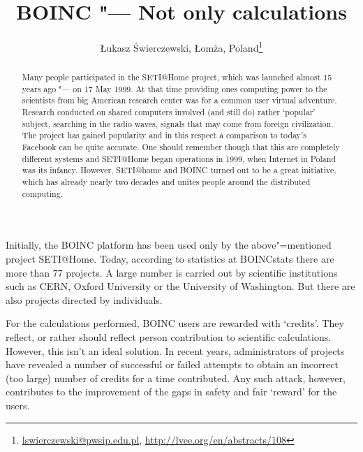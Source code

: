 \documentclass[10pt, a5paper]{article}
\begin{document}
\title{BOINC "--- Not only calculations}
\author{\L{}ukasz \'S{}wierczewski, \L{}om\.z{}a, Poland\footnote{\url{lswierczewski@pwsip.edu.pl}, \url{http://lvee.org/en/abstracts/108}}}
\maketitle
\begin{abstract}
Many people participated in the SETI@\-Home project, which was
launched almost 15 years ago "--- on 17 May 1999. At that time providing ones computing power to the scientists from big American research center was for a common user virtual adventure. Research conducted on shared computers involved (and still do) rather ‘popular’ subject, searching in the radio waves, signals that may come from foreign civilization. The project has gained popularity and in this respect a comparison to
today's Facebook can be quite accurate. One should remember though that this are completely different systems and SETI@\-Home began operations in 1999, when Internet in Poland was its infancy. However, SETI@\-home and BOINC turned out to be a great initiative, which has already nearly two decades and unites people around the distributed computing.
\end{abstract}
Initially, the BOINC platform has been used only by the above"=mentioned project SETI@\-Home. Today, according to statistics at BOINC\-stats there are more than 77 projects. A large number is carried out by scientific institutions such as CERN, Oxford University or the University of Washington. But there are also projects directed by individuals.

For the calculations performed, BOINC users are rewarded with `credits'. They reflect, or rather should reflect person contribution to scientific calculations. However, this isn't an ideal solution. In recent years, administrators of projects have revealed a number of successful or failed attempts to obtain an incorrect (too large) number of credits for a time contributed. Any such attack, however, contributes to the improvement of the gaps in safety and fair `reward' for the users.
\end{document}
